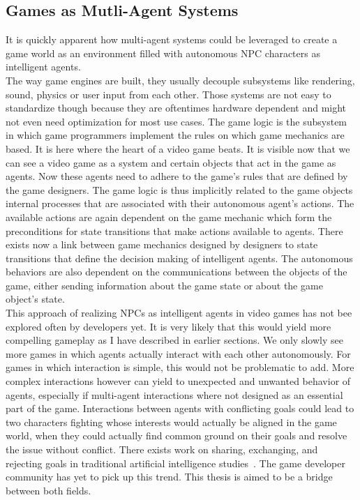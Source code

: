 \subsection{Games as Mutli-Agent Systems}
It is quickly apparent how multi-agent systems could be leveraged to create a game world as an environment filled with autonomous NPC characters as intelligent agents.\\
The way game engines are built, they usually decouple subsystems like rendering, sound, physics or user input from each other. Those systems are not easy to standardize though because they are oftentimes hardware dependent and might not even need optimization for most use cases. The game logic is the subsystem in which game programmers implement the rules on which game mechanics are based. It is here where the heart of a video game beats. It is visible now that we can see a video game as a system and certain objects that act in the game as agents. Now these agents need to adhere to the game's rules that are defined by the game designers. The game logic is thus implicitly related to the game objects internal processes that are associated with their autonomous agent's actions. The available actions are again dependent on the game mechanic which form the preconditions for state transitions that make actions available to agents. There exists now a link between game mechanics designed by designers to state transitions that define the decision making of intelligent agents. The autonomous behaviors are also dependent on the communications between the objects of the game, either sending information about the game state or about the game object's state.~\cite{MarinLora2020}\\
This approach of realizing NPCs as intelligent agents in video games has not bee explored often by developers yet. It is very likely that this would yield more compelling gameplay as I have described in earlier sections. We only slowly see more games in which agents actually interact with each other autonomously. For games in which interaction is simple, this would not be problematic to add. More complex interactions however can yield to unexpected and unwanted behavior of agents, especially if multi-agent interactions where not designed as an essential part of the game. Interactions between agents with conflicting goals could lead to two characters fighting whose interests would actually be aligned in the game world, when they could actually find common ground on their goals and resolve the issue without conflict. There exists work on sharing, exchanging, and rejecting goals in traditional artificial intelligence studies~\cite{Kraus1997}. The game developer community has yet to pick up this trend. This thesis is aimed to be a bridge between both fields.~\cite{Dignum2009}\\
